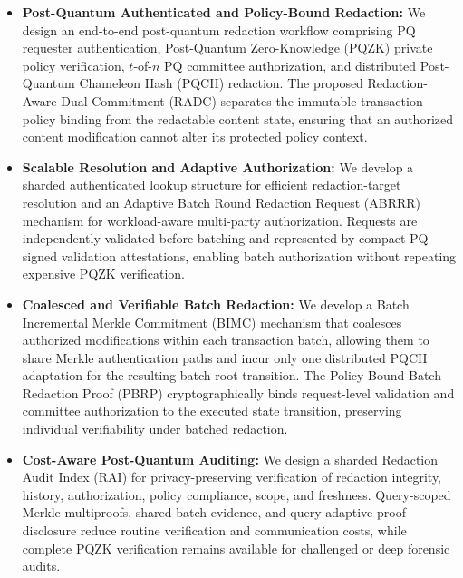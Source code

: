 \documentclass[lettersize,journal]{IEEEtran}
\begin{document}
    \begin{itemize}
    
    \item \textbf{Post-Quantum Authenticated and Policy-Bound Redaction:}
    We design an end-to-end post-quantum redaction workflow comprising
    PQ requester authentication, Post-Quantum Zero-Knowledge (PQZK)
    private policy verification, $t$-of-$n$ PQ committee authorization,
    and distributed Post-Quantum Chameleon Hash (PQCH) redaction.
    The proposed Redaction-Aware Dual Commitment (RADC) separates the
    immutable transaction-policy binding from the redactable content
    state, ensuring that an authorized content modification cannot alter
    its protected policy context.
    
    \item \textbf{Scalable Resolution and Adaptive Authorization:}
    We develop a sharded authenticated lookup structure for efficient
    redaction-target resolution and an Adaptive Batch Round Redaction
    Request (ABRRR) mechanism for workload-aware multi-party
    authorization. Requests are independently validated before batching
    and represented by compact PQ-signed validation attestations, enabling
    batch authorization without repeating expensive PQZK verification.
    
    \item \textbf{Coalesced and Verifiable Batch Redaction:}
    We develop a Batch Incremental Merkle Commitment (BIMC) mechanism that
    coalesces authorized modifications within each transaction batch,
    allowing them to share Merkle authentication paths and incur only one
    distributed PQCH adaptation for the resulting batch-root transition.
    The Policy-Bound Batch Redaction Proof (PBRP) cryptographically binds
    request-level validation and committee authorization to the executed
    state transition, preserving individual verifiability under batched
    redaction.
    
    \item \textbf{Cost-Aware Post-Quantum Auditing:}
    We design a sharded Redaction Audit Index (RAI) for
    privacy-preserving verification of redaction integrity, history,
    authorization, policy compliance, scope, and freshness. Query-scoped
    Merkle multiproofs, shared batch evidence, and query-adaptive proof
    disclosure reduce routine verification and communication costs, while
    complete PQZK verification remains available for challenged or deep
    forensic audits.
    
    
    \end{itemize}
    
\end{document}

